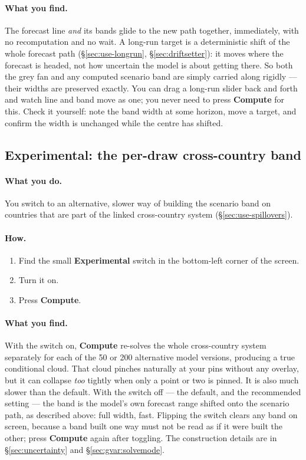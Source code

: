 \documentclass[11pt]{article}
\theoremstyle{definition}
\theoremstyle{remark}
\begin{document}
\paragraph{What you find.} The forecast line \emph{and} its bands glide to the new
path together, immediately, with no recomputation and no wait. A long-run target is a
deterministic shift of the whole forecast path (\S\ref{sec:use-longrun},
\S\ref{sec:driftsetter}): it moves where the forecast is headed, not how uncertain the
model is about getting there. So both the grey fan and any computed scenario band are
simply carried along rigidly --- their widths are preserved exactly. You can drag a
long-run slider back and forth and watch line and band move as one; you never need to
press \textbf{Compute} for this. Check it yourself: note the band width at some
horizon, move a target, and confirm the width is unchanged while the centre has
shifted.

\subsection{Experimental: the per-draw cross-country band}

\paragraph{What you do.} You switch to an alternative, slower way of building the
scenario band on countries that are part of the linked cross-country system
(\S\ref{sec:use-spillovers}).

\paragraph{How.}
\begin{enumerate}
  \item Find the small \textbf{Experimental} switch in the bottom-left corner of the
    screen.
  \item Turn it on.
  \item Press \textbf{Compute}.
\end{enumerate}

\paragraph{What you find.} With the switch on, \textbf{Compute} re-solves the whole
cross-country system separately for each of the 50 or 200 alternative model versions,
producing a true conditional cloud. That cloud pinches naturally at your pins without
any overlay, but it can collapse \emph{too} tightly when only a point or two is pinned.
It is also much slower than the default. With the switch off --- the default, and the
recommended setting --- the band is the model's own forecast range shifted onto the
scenario path, as described above: full width, fast. Flipping the switch clears any
band on screen, because a band built one way must not be read as if it were built the
other; press \textbf{Compute} again after toggling. The construction details are in
\S\ref{sec:uncertainty} and \S\ref{sec:gvar:solvemode}.
\end{document}
